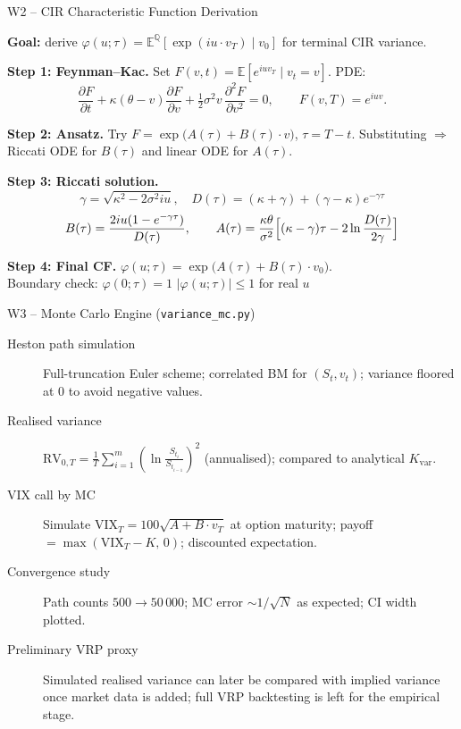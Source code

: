 \documentclass[aspectratio=169, 11pt]{beamer}
\begin{document}
\begin{frame}{W2 -- CIR Characteristic Function Derivation}

\textbf{Goal:} derive $\varphi(u;\tau) = \mathbb{E}^{\mathbb{Q}}[\exp(i u\cdot v_T) \mid v_0]$ for terminal CIR variance.

\medskip
\textbf{Step 1: Feynman--Kac.}\;
Set $F(v,t)=\mathbb{E}[e^{iuv_T}\mid v_t=v]$. PDE:
\[
  \frac{\partial F}{\partial t} + \kappa(\theta-v)\frac{\partial F}{\partial v}
  + \tfrac{1}{2}\sigma^2 v\,\frac{\partial^2 F}{\partial v^2} = 0,
  \qquad F(v,T)=e^{iuv}.
\]

\textbf{Step 2: Ansatz.}\;
Try $F = \exp\!\bigl(A(\tau)+B(\tau)\cdot v\bigr)$, $\tau=T-t$.
Substituting $\Rightarrow$ Riccati ODE for $B(\tau)$ and linear ODE for $A(\tau)$.

\medskip
\textbf{Step 3: Riccati solution.}
\[
  \gamma = \sqrt{\kappa^2 - 2\sigma^2 iu},\quad
  D(\tau)=(\kappa+\gamma)+(\gamma-\kappa)e^{-\gamma\tau}
\]
\[
  B(\tau) = \frac{2iu(1-e^{-\gamma\tau})}{D(\tau)},\qquad
  A(\tau) = \frac{\kappa\theta}{\sigma^2}\Bigl[(\kappa-\gamma)\tau - 2\ln\frac{D(\tau)}{2\gamma}\Bigr]
\]

\textbf{Step 4: Final CF.}\;
$\varphi(u;\tau)=\exp\!\bigl(A(\tau)+B(\tau)\cdot v_0\bigr)$.\\
Boundary check: $\varphi(0;\tau)=1$ \;\checkmark\qquad $|\varphi(u;\tau)|\le 1$ for real $u$ \;\checkmark
\end{frame}

\begin{frame}{W3 -- Monte Carlo Engine \;(\texttt{variance\_mc.py})}

\begin{description}
  \item[Heston path simulation]
    Full-truncation Euler scheme; correlated BM for $(S_t, v_t)$;
    variance floored at 0 to avoid negative values.

    \item[Realised variance]
    $\displaystyle
    \mathrm{RV}_{0,T}
    =
    \frac{1}{T}
    \sum_{i=1}^{m}
    \left(
    \ln\frac{S_{t_i}}{S_{t_{i-1}}}
    \right)^2
    $
    \;(annualised);
    compared to analytical $K_{\mathrm{var}}$.

  \item[VIX call by MC]
    Simulate $\mathrm{VIX}_T = 100\sqrt{A+B\cdot v_T}$ at option maturity;
    payoff $= \max(\mathrm{VIX}_T - K,\,0)$; discounted expectation.

  \item[Convergence study]
    Path counts $500 \to 50\,000$;
    MC error $\sim 1/\sqrt{N}$ as expected; CI width plotted.

  \item[Preliminary VRP proxy]
    Simulated realised variance can later be compared with implied variance once market data is added;
    full VRP backtesting is left for the empirical stage.
\end{description}
\end{frame}
\end{document}
